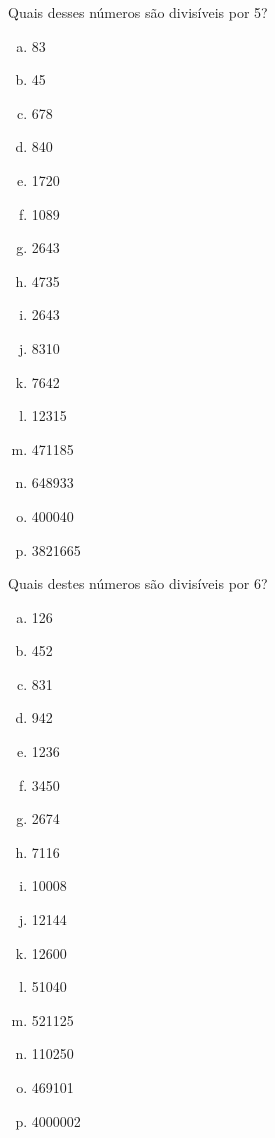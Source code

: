 \item Quais desses números são divisíveis por 5?
\begin{multicols}{4}
\begin{enumerate}[a)]
	\item 83
	\item 45
	\item 678
	\item 840
	\item 1720
	\item 1089
	\item 2643
	\item 4735
	\item 2643
	\item 8310
	\item 7642
	\item 12315
	\item 471185
	\item 648933
	\item 400040
	\item 3821665
\end{enumerate}
\end{multicols}

\item Quais destes números são divisíveis por 6?
\begin{multicols}{4}
\begin{enumerate}[a)]
	\item 126
	\item 452
	\item 831
	\item 942
	\item 1236
	\item 3450
	\item 2674
	\item 7116
	\item 10008
	\item 12144
	\item 12600 
	\item 51040
	\item 521125
	\item 110250
	\item 469101
	\item 4000002
\end{enumerate}
\end{multicols}

